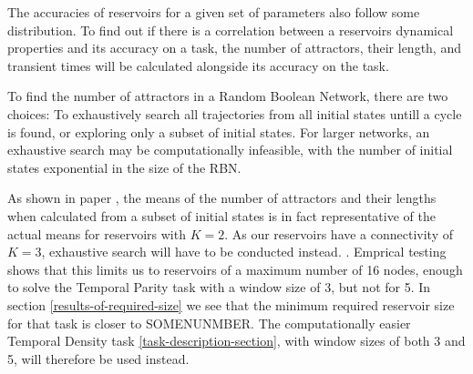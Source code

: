 The accuracies of reservoirs for a given set of parameters also follow some distribution.
To find out if there is a correlation between a reservoirs dynamical properties and its accuracy on a task,
the number of attractors, their length, and transient times will be calculated alongside its accuracy on the task.

To find the number of attractors in a Random Boolean Network, there are two choices:
To exhaustively search all trajectories from all initial states untill a cycle is found,
or exploring only a subset of initial states.
For larger networks, an exhaustive search may be computationally infeasible,
with the number of initial states exponential in the size of the RBN.

As shown in paper ,
the means of the number of attractors and their lengths when calculated from a subset of initial states is in fact representative of the actual means for reservoirs with $K=2$.
As our reservoirs have a connectivity of $K = 3$, exhaustive search will have to be conducted instead.
.
Emprical testing shows that this limits us to reservoirs of a maximum number of 16 nodes,
enough to solve the Temporal Parity task with a window size of 3, but not for 5.
In section \ref{results-of-required-size} we see that the minimum required reservoir size for that task is closer to SOMENUNMBER.
The computationally easier Temporal Density task \ref{task-description-section},
with window sizes of both 3 and 5,
will therefore be used instead.
